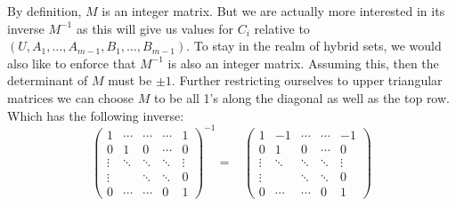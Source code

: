 

By definition, $M$ is an integer matrix.
But we are actually more interested in its inverse $M^{-1}$ as this will give us values for $C_i$ 
relative to $( U, A_1, \ldots, A_{m-1}, B_1, \ldots, B_{m-1} )$.
To stay in the realm of hybrid sets, we would also like to enforce that $M^{-1}$ is also an integer matrix.
Assuming this, then the determinant of $M$ must be $\pm 1$.
Further restricting ourselves to upper triangular matrices we can choose $M$ to be all 1's along the diagonal
as well as the top row. 
Which has the following inverse:
\begin{equation*}
	\begin{pmatrix}
		1 		&\cdots 	&\cdots 	&\cdots 	& 1 		\\[-0.5em]
		0		& 1		& 0 		&\cdots 	& 0 		\\[-0.5em]
		\vdots 	&\ddots 	&\ddots 	&\ddots 	&\vdots 	\\[-0.5em]
		\vdots 	&		&\ddots 	&\ddots 	& 0 		\\[-0.5em]
		0 		&\cdots 	&\cdots 	& 0 		& 1
	\end{pmatrix}^{-1}
	= \; \; \;
	\begin{pmatrix}
		1 		&-1	 	&\cdots 	&\cdots 	& -1		\\[-0.5em]
		0		& 1		& 0 		&\cdots 	& 0 		\\[-0.5em]
		\vdots 	&\ddots 	&\ddots 	&\ddots 	&\vdots 	\\[-0.5em]
		\vdots 	&		&\ddots 	&\ddots 	& 0 		\\[-0.5em]
		0 		&\cdots 	&\cdots 	& 0 		& 1
	\end{pmatrix}
\end{equation*}



